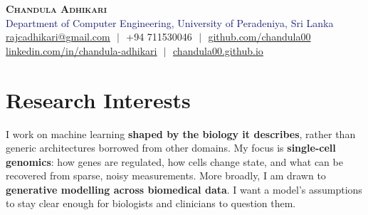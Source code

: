 \documentclass[a4paper,10pt]{article}
\begin{document}
\begin{flushright}
  \color{gray}
  \item
\end{flushright}

\vspace{-0.6in}
\begin{center}
    \textbf{\Huge \scshape Chandula Adhikari} \\ \vspace{2pt}
    \large
    \textcolor{MidnightBlue}{Department of Computer Engineering, University of Peradeniya, Sri Lanka}\\ \vspace{5pt}
    \small
    \href{mailto:rajcadhikari@gmail.com}
    {\underline{rajcadhikari@gmail.com}} $  $ $ \mid $ $  $
    +94 711530046 $  $ $ \mid $ $  $
    \href{https://github.com/chandula00}{\underline{github.com/chandula00}} \\ \vspace{2pt}
    \href{https://www.linkedin.com/in/janith-chandula-adhikari-5543a5223}{\underline{linkedin.com/in/chandula-adhikari}} $  $ $ \mid $ $  $
    \href{https://chandula00.github.io/}{\underline{chandula00.github.io}}
\end{center}

\section{\textbf{Research Interests}}
    \vspace{1pt}



        I work on machine learning \textbf{shaped by the biology it describes}, rather than generic architectures borrowed from other domains. My focus is \textbf{single-cell genomics}: how genes are regulated, how cells change state, and what can be recovered from sparse, noisy measurements. More broadly, I am drawn to \textbf{generative modelling across biomedical data}. I want a model's assumptions to stay clear enough for biologists and clinicians to question them.
\end{document}
